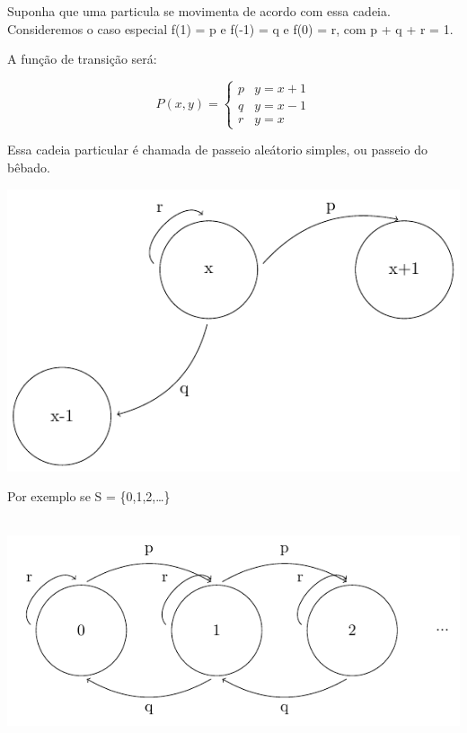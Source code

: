 \documentclass[]{article}
\theoremstyle{definition}
\theoremstyle{definition}
\theoremstyle{definition}
\theoremstyle{remark}
\let\BeginKnitrBlock\begin \let\EndKnitrBlock\end
\begin{document}
\BeginKnitrBlock{example}
\protect\hypertarget{exm:unnamed-chunk-25}{}{\label{exm:unnamed-chunk-25} }
Suponha que uma particula se movimenta de acordo com essa cadeia.
Consideremos o caso especial f(1) = p e f(-1) = q e f(0) = r, com p + q
+ r = 1.

A função de transição será:

\begin{equation}
P(x,y) = \left\{\begin{matrix}
p & y = x + 1 \\
q & y = x - 1\\
r & y = x
\end{matrix}\right.

\end{equation}

Essa cadeia particular é chamada de passeio aleátorio simples, ou
passeio do bêbado.
\EndKnitrBlock{example}

\begin{center}\includegraphics[width=1\linewidth,height=250x]{./figuras/pe2} \end{center}

Por exemplo se S = \{0,1,2,\ldots{}\}

\begin{center}\includegraphics[width=1\linewidth,height=250px]{./figuras/pe3} \end{center}
\end{document}

